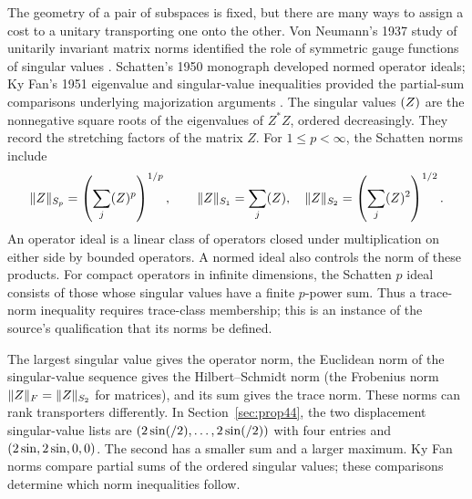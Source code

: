 \documentclass[pdflatex]{sn-jnl} %
\theoremstyle{thmstyleone}
\begin{document}
The geometry of a pair of subspaces is fixed, but there are many ways
to assign a cost to a unitary transporting one onto the other.
Von Neumann's 1937 study of unitarily invariant matrix norms identified
the role of symmetric gauge functions of singular values
\citep{vonneumann1937matrix}. Schatten's 1950 monograph developed normed
operator ideals; Ky Fan's 1951 eigenvalue and singular-value inequalities
provided the partial-sum comparisons underlying majorization
arguments \citep{schatten1950crossspaces,fan1951maximum,bhatia1997matrix}.
The singular values $\sym{SingularValue}(Z)$ are the nonnegative square roots of the
eigenvalues of $Z^*Z$, ordered decreasingly. They record the stretching
factors of the matrix $Z$. For $1\leq p<\infty$, the Schatten norms include
\begin{equation}
 \|Z\|_{S_p}=\left(\sum_j \sym{SingularValue}(Z)^p\right)^{1/p},
 \qquad
 \|Z\|_{S_1}=\sum_j \sym{SingularValue}(Z),
 \quad
 \|Z\|_{S_2}=\left(\sum_j \sym{SingularValue}(Z)^2\right)^{1/2}.
 \label{eq:history-schatten}
\end{equation}
An operator ideal is a linear class of operators closed under multiplication
on either side by bounded operators. A normed ideal also controls the norm
of these products. For compact operators in infinite dimensions, the
Schatten $p$ ideal consists of those whose singular values have a finite
$p$-power sum. Thus a trace-norm inequality requires trace-class membership;
this is an instance of the source's qualification that its norms be defined.

The largest singular value gives the operator norm, the Euclidean
norm of the singular-value sequence gives the Hilbert--Schmidt norm
(the Frobenius norm $\|Z\|_F=\|Z\|_{S_2}$ for matrices),
and its sum gives the trace norm. These norms can rank transporters
differently. In Section~\ref{sec:prop44}, the two displacement singular-value
lists are $(2\sin(\sym{theta}/2),\ldots,2\sin(\sym{theta}/2))$ with four entries and
$(2\sin\sym{theta},2\sin\sym{theta},0,0)$. The second has a smaller sum and a larger
maximum. Ky Fan norms compare partial sums of the ordered singular values;
these comparisons determine which norm inequalities follow.
\end{document}
